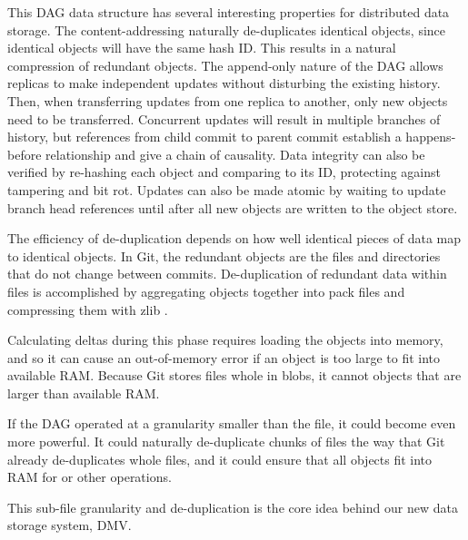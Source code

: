 This DAG data structure has several interesting properties for distributed data storage.
The content-addressing naturally de-duplicates identical objects, since identical objects will have the same hash ID.
This results in a natural compression of redundant objects.
The append-only nature of the DAG allows replicas to make independent updates without disturbing the existing history.
Then, when transferring updates from one replica to another, only new objects need to be transferred.
Concurrent updates will result in multiple branches of history, but references from child commit to parent commit establish a happens-before relationship and give a chain of causality.
Data integrity can also be verified by re-hashing each object and comparing to its ID, protecting against tampering and bit rot.
Updates can also be made atomic by waiting to update branch head references until after all new objects are written to the object store.

The efficiency of de-duplication depends on how well identical pieces of data map to identical objects.
In Git, the redundant objects are the files and directories that do not change between commits.
De-duplication of redundant data within files is accomplished by aggregating objects together into pack files and compressing them with zlib \cite[Section 10.4]{git_book}.

Calculating deltas during this  phase requires loading the objects into memory, and so it can cause an out-of-memory error if an object is too large to fit into available RAM.
Because Git stores files whole in \glspl{blob}, it cannot  objects that are larger than available RAM.

If the \gls{DAG} operated at a granularity smaller than the file, it could become even more powerful.
It could naturally de-duplicate chunks of files the way that Git already de-duplicates whole files, and it could ensure that all objects fit into RAM for  or other operations.

This sub-file granularity and de-duplication is the core idea behind our new data storage system, \acrlong{DMV}.


%
